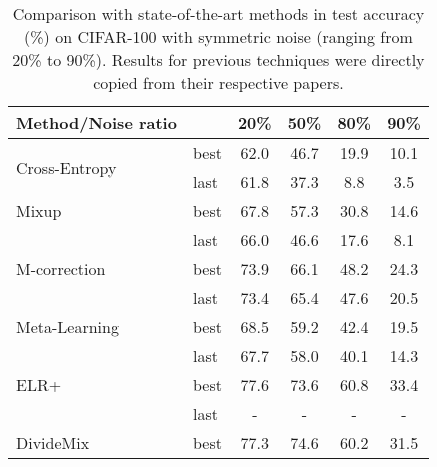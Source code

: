 \documentclass[letterpaper]{article} \usepackage{aaai22}  \usepackage{times}  \usepackage{helvet}  \usepackage{courier}  \usepackage[hyphens]{url}  \usepackage{graphicx} \urlstyle{rm} \def\UrlFont{\rm}  \usepackage{natbib}  \usepackage{caption} \DeclareCaptionStyle{ruled}{labelfont=normalfont,labelsep=colon,strut=off} \frenchspacing  \setlength{\pdfpagewidth}{8.5in}  \setlength{\pdfpageheight}{11in}  \usepackage{algorithm}
\begin{document}
\begin{table}[]
\caption{Comparison with state-of-the-art methods in test accuracy (\%) on CIFAR-100 with symmetric noise (ranging from 20\% to 90\%). Results for previous techniques were directly copied from their respective papers.}
\vskip 0.15in
\scriptsize
\centering
\begin{tabular}{@{}llcccc@{}}
\toprule
Method/Noise ratio                       & \multicolumn{1}{l|}{}     & 20\%          & 50\%          & 80\%          & 90\%          \\ \midrule
\multirow{2}{*}{Cross-Entropy}           & \multicolumn{1}{l|}{best} & 62.0          & 46.7          & 19.9          & 10.1          \\
                                         & \multicolumn{1}{l|}{last} & 61.8          & 37.3          & 8.8           & 3.5           \\ \midrule
\multirow{1}{*}{Mixup}             & \multicolumn{1}{l|}{best} & 67.8          & 57.3          & 30.8          & 14.6          \\
\multirow{1}{*}{\cite{2018mixup}}                                         & \multicolumn{1}{l|}{last} & 66.0          & 46.6          & 17.6          & 8.1           \\ \midrule
\multirow{1}{*}{M-correction}      & \multicolumn{1}{l|}{best} & 73.9          & 66.1          & 48.2          & 24.3          \\
\multirow{1}{*}{\cite{2019Unsupervised}}                                         & \multicolumn{1}{l|}{last} & 73.4          & 65.4          & 47.6          & 20.5          \\ \midrule
\multirow{1}{*}{Meta-Learning}     & \multicolumn{1}{l|}{best} & 68.5          & 59.2          & 42.4          & 19.5          \\
\multirow{1}{*}{\cite{2019Learning}}                                         & \multicolumn{1}{l|}{last} & 67.7          & 58.0          & 40.1          & 14.3          \\ \midrule
\multirow{1}{*}{ELR+}              & \multicolumn{1}{l|}{best} & 77.6          & 73.6          & 60.8          & 33.4          \\
\multirow{1}{*}{\cite{2020Early}}                                         & \multicolumn{1}{l|}{last} & -             & -             & -             & -             \\ \midrule
\multirow{1}{*}{DivideMix}         & \multicolumn{1}{l|}{best} & 77.3          & 74.6          & 60.2          & 31.5          \\

\end{tabular}
\end{table}
\end{document}

